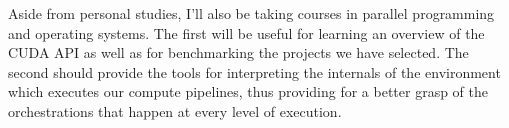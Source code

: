 \documentclass[conference, onecolumn]{IEEEtran}
\begin{document}
Aside from personal studies, I'll also be taking courses in parallel
programming and operating systems.
The first will be useful for learning an overview of the CUDA API as well as
for benchmarking the projects we have selected.
The second should provide the tools for interpreting the internals of the
environment which executes our compute pipelines, thus providing for a better
grasp of the orchestrations that happen at every level of execution.



\end{document}
